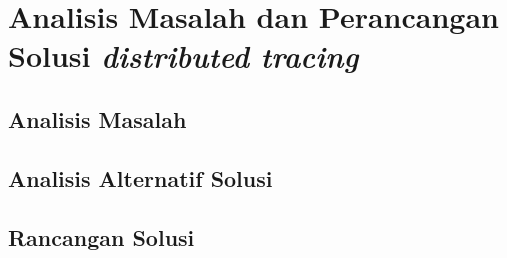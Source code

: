 \chapter{Analisis Masalah dan Perancangan Solusi \textit{distributed tracing}}



\section{Analisis Masalah}




\section{Analisis Alternatif Solusi}

\section{Rancangan Solusi}


